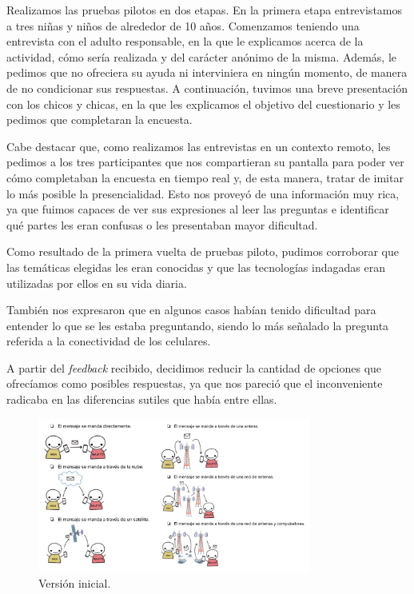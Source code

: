 Realizamos las pruebas pilotos en dos etapas. En la primera etapa entrevistamos a tres niñas y niños de alrededor de 10 años. Comenzamos teniendo una entrevista con el adulto responsable, en la que le explicamos acerca de la actividad, cómo sería realizada y del carácter anónimo de la misma. Además, le pedimos que no ofreciera su ayuda ni interviniera en ningún momento, de manera de no condicionar sus respuestas. A continuación, tuvimos una breve presentación con los chicos y chicas, en la que les explicamos el objetivo del cuestionario y les pedimos que completaran la encuesta.

Cabe destacar que, como realizamos las entrevistas en un contexto remoto, les pedimos a los tres participantes que nos compartieran su pantalla para poder ver cómo completaban la encuesta en tiempo real y, de esta manera, tratar de imitar lo más posible la presencialidad.  Esto nos proveyó de una información muy rica, ya que fuimos capaces de ver sus expresiones al leer las preguntas e identificar qué partes les eran confusas o les presentaban mayor dificultad. 

Como resultado de la primera vuelta de pruebas piloto, pudimos corroborar que las temáticas elegidas les eran conocidas y que las tecnologías indagadas eran utilizadas por ellos en su vida diaria.

También nos expresaron que en algunos casos habían tenido dificultad para entender lo que se les estaba preguntando, siendo lo más señalado la pregunta referida a la conectividad de los celulares.

A partir del \textit{feedback} recibido, decidimos reducir la cantidad de opciones que ofrecíamos como posibles respuestas, ya que nos pareció que el inconveniente radicaba en las diferencias sutiles que había entre ellas. 

\begin{figure}[h]
    \centering
    \includegraphics[width=0.8\textwidth]{images/5.png} 
    \caption{Versión inicial.}
    \label{fig:cuest5}
\end{figure}


